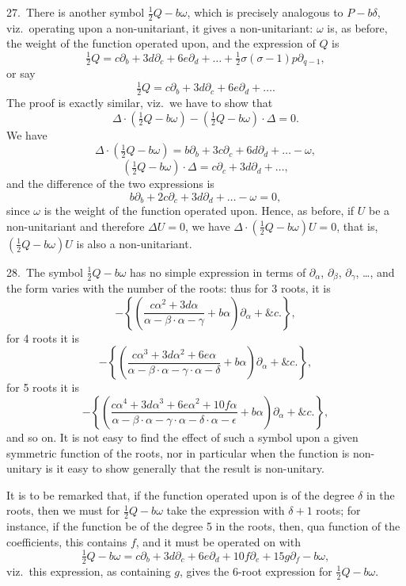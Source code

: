 \documentclass[11pt]{article}
\begin{document}
27.\ There is another symbol $\tfrac{1}{2}Q - b\omega$, which is precisely analogous to $P - b\delta$, viz.\ operating upon a non-unitariant, it gives a non-unitariant: $\omega$ is, as before, the weight of the function operated upon, and the expression of $Q$ is
\[
\tfrac{1}{2}Q = c\partial_b + 3d\partial_c + 6e\partial_d + \ldots + \tfrac{1}{2}\sigma(\sigma - 1)p\partial_{q-1},
\]
or say
\[
\tfrac{1}{2}Q = c\partial_b + 3d\partial_c + 6e\partial_d + \ldots.
\]
The proof is exactly similar, viz.\ we have to show that
\[
\Delta\cdot(\tfrac{1}{2}Q - b\omega) - (\tfrac{1}{2}Q - b\omega)\cdot\Delta = 0.
\]
We have
\[
\Delta\cdot(\tfrac{1}{2}Q - b\omega) = b\partial_b + 3c\partial_c + 6d\partial_d + \ldots - \omega,
\]
\[
(\tfrac{1}{2}Q - b\omega)\cdot\Delta = c\partial_c + 3d\partial_d + \ldots,
\]
and the difference of the two expressions is
\[
b\partial_b + 2c\partial_c + 3d\partial_d + \ldots - \omega = 0,
\]
since $\omega$ is the weight of the function operated upon. Hence, as before, if $U$ be a non-unitariant and therefore $\Delta U = 0$, we have $\Delta\cdot(\tfrac{1}{2}Q - b\omega) U = 0$, that is, $(\tfrac{1}{2}Q - b\omega) U$ is also a non-unitariant.

28.\ The symbol $\tfrac{1}{2}Q - b\omega$ has no simple expression in terms of $\partial_\alpha$, $\partial_\beta$, $\partial_\gamma$, \ldots, and the form varies with the number of the roots: thus for 3 roots, it is
\[
-\left\{\!\left(\frac{c\alpha^2 + 3d\alpha}{\alpha - \beta\cdot\alpha - \gamma} + b\alpha\!\right) \partial_\alpha + \&c.\!\right\},
\]
for 4 roots it is
\[
-\left\{\!\left(\frac{c\alpha^3 + 3d\alpha^2 + 6e\alpha}{\alpha - \beta\cdot\alpha - \gamma\cdot\alpha - \delta} + b\alpha\!\right)\partial_\alpha + \&c.\!\right\},
\]
for 5 roots it is
\[
-\left\{\!\left(\frac{c\alpha^4 + 3d\alpha^3 + 6e\alpha^2 + 10f\alpha}{\alpha - \beta\cdot\alpha - \gamma\cdot\alpha - \delta\cdot\alpha - \epsilon} + b\alpha\!\right)\partial_\alpha + \&c.\!\right\},
\]
and so on. It is not easy to find the effect of such a symbol upon a given symmetric function of the roots, nor in particular when the function is non-unitary is it easy to show generally that the result is non-unitary.

It is to be remarked that, if the function operated upon is of the degree $\delta$ in the roots, then we must for $\tfrac{1}{2}Q - b\omega$ take the expression with $\delta + 1$ roots; for instance, if the function be of the degree 5 in the roots, then, qua function of the coefficients, this contains $f$, and it must be operated on with
\[
\tfrac{1}{2}Q - b\omega = c\partial_b + 3d\partial_c + 6e\partial_d + 10f\partial_e + 15g\partial_f - b\omega,
\]
viz.\ this expression, as containing $g$, gives the 6-root expression for $\tfrac{1}{2}Q - b\omega$.
\end{document}
